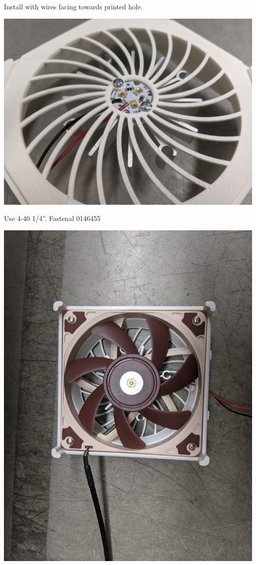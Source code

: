 \documentclass[11pt]{article}
\begin{document}
Install with wires facing towards printed hole.

\begin{center}
  \includegraphics[width=\textwidth/2]{"./led-and-heatsink.jpg"}
\end{center}

Use 4-40 1/4''.   Fastenal 0146455

\begin{center}
  \includegraphics[width=\textwidth/2]{"./mounted-fan.jpg"}
\end{center}
\end{document}
